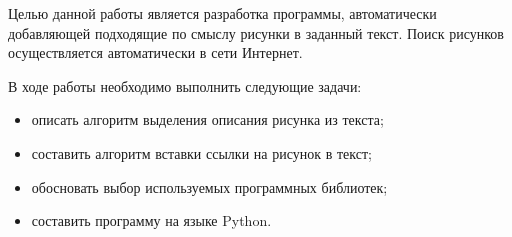 \intro
Целью данной работы является разработка программы, автоматически добавляющей
подходящие по смыслу рисунки в заданный текст. Поиск рисунков осуществляется
автоматически в сети Интернет.

В ходе работы необходимо выполнить следующие задачи:

\begin{itemize}
    \item описать алгоритм выделения описания рисунка из текста;
    \item составить алгоритм вставки ссылки на рисунок в текст;
    \item обосновать выбор используемых программных библиотек;
    \item составить программу на языке Python.
\end{itemize}
